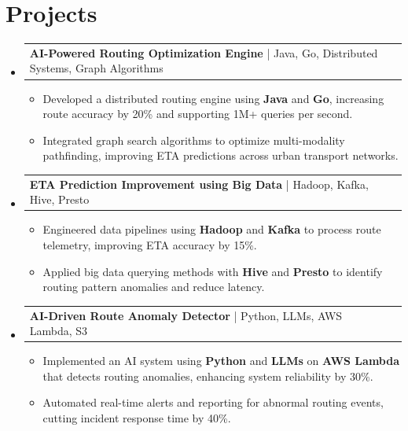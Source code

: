\documentclass[letterpaper,11pt]{article}
\makeatletter
\newcommand{\resumeItem}[1]{
  \item\footnotesize{
    {#1 \vspace{-2pt}}
  }
}
\newcommand{\resumeProjectHeading}[2]{
    \item
    \begin{tabular*}{1.001\textwidth}{l@{\extracolsep{\fill}}r}
      \small#1 & \textbf{\small #2}\\
    \end{tabular*}\vspace{-7pt}
}
\newcommand{\resumeSubHeadingListStart}{\begin{itemize}[leftmargin=0pt, label={}]}
\newcommand{\resumeSubHeadingListEnd}{\end{itemize}}
\newcommand{\resumeItemListStart}{\begin{itemize}[leftmargin=*]}
\newcommand{\resumeItemListEnd}{\end{itemize}\vspace{-5pt}}
\makeatother
\begin{document}
\section{Projects}
    \vspace{-5pt}
    \resumeSubHeadingListStart
      \resumeProjectHeading
          {\textbf{AI-Powered Routing Optimization Engine} | Java, Go, Distributed Systems, Graph Algorithms}{}
          \resumeItemListStart
              \resumeItem{Developed a distributed routing engine using \textbf{Java} and \textbf{Go}, increasing route accuracy by 20\% and supporting 1M+ queries per second.}
              \resumeItem{Integrated graph search algorithms to optimize multi-modality pathfinding, improving ETA predictions across urban transport networks.}
          \resumeItemListEnd
          \vspace{-12pt}
      \resumeProjectHeading
          {\textbf{ETA Prediction Improvement using Big Data} | Hadoop, Kafka, Hive, Presto}{}
          \resumeItemListStart
              \resumeItem{Engineered data pipelines using \textbf{Hadoop} and \textbf{Kafka} to process route telemetry, improving ETA accuracy by 15\%.}
              \resumeItem{Applied big data querying methods with \textbf{Hive} and \textbf{Presto} to identify routing pattern anomalies and reduce latency.}
          \resumeItemListEnd
          \vspace{-12pt}
      \resumeProjectHeading
          {\textbf{AI-Driven Route Anomaly Detector} | Python, LLMs, AWS Lambda, S3}{}
          \resumeItemListStart
              \resumeItem{Implemented an AI system using \textbf{Python} and \textbf{LLMs} on \textbf{AWS Lambda} that detects routing anomalies, enhancing system reliability by 30\%.}
              \resumeItem{Automated real-time alerts and reporting for abnormal routing events, cutting incident response time by 40\%.}
          \resumeItemListEnd 
    \resumeSubHeadingListEnd
\end{document}
